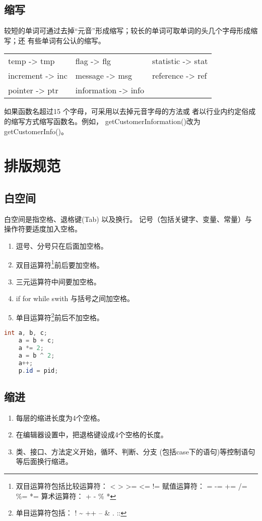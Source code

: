 \documentclass[a4paper,12pt]{article}
\makeatletter
\newcommand{\tabcaption}{\def\@captype{table}\caption}
\makeatother
\begin{document}
\subsection{缩写}
较短的单词可通过去掉“元音”形成缩写；较长的单词可取单词的头几个字母形成缩写；还
有些单词有公认的缩写。
\tabcaption{ 常见的缩写 }
\begin{tabular}{lll} 
    temp      ->  tmp & 
    flag      ->  flg &
    statistic ->  stat \\ 
    increment ->  inc  &
    message   ->  msg  &
    reference ->  ref \\
    pointer   ->  ptr & 
    information -> info &\\
\end{tabular}

如果函数名超过15 个字母，可采用以去掉元音字母的方法或
者以行业内约定俗成的缩写方式缩写函数名。例如，
getCustomerInformation()改为getCustomerInfo()。

\section{排版规范}
\subsection{白空间}
白空间是指空格、退格键(Tab) 以及换行。
记号（包括关键字、变量、常量）与 操作符要适度加入空格。
\begin{enumerate}
    \item 逗号、分号只在后面加空格。
    \item 双目运算符\footnote{双目运算符包括比较运算符：\kern10pt < > >= <= !=
        \hskip15pt 赋值运算符：\kern10pt = -= += /= \%= *= \hskip15pt 
        算术运算符：\kern10pt + - \% *}前后要加空格。
    \item 三元运算符中间要加空格。 
    \item if for while swith 与括号之间加空格。
    \item 单目运算符\footnote{单目运算符包括： ! \~{} ++ -- \& . ::}前后不加空格。
\end{enumerate}
\begin{lstlisting}[language=java,multicols=2,label=space,
    caption=白空间使用示例, showspaces=true,
    showstringspaces=false, numbers=none, frame=shadowbox]
    int a, b, c;
    a = b + c;
    a *= 2;
    a = b ^ 2;
    a++;
    p.id = pid;
\end{lstlisting}
\subsection{缩进}
\begin{enumerate}
    \item 每层的缩进长度为4个空格。
    \item 在编辑器设置中，把退格键设成4个空格的长度。
    \item 类、接口、方法定义开始，循环、判断、分支
        (包括case下的语句)等控制语句等后面换行缩进。
\end{enumerate}
\end{document}
